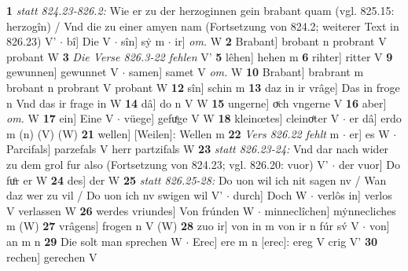 \documentclass[8pt,a4paper,notitlepage]{article}
\begin{document}
\begin{table}[ht]
\begin{minipage}[t]{0.5\linewidth}
\textbf{1} \textit{statt 824.23-826.2:} Wie er zu der herzoginnen gein brabant quam (vgl. 825.15: herzogîn) / Vnd die zu einer amyen nam (Fortsetzung von 824.2; weiterer Text in 826.23) V'   $\cdot$ bî] Die V  $\cdot$ sîn] sẏ m  $\cdot$ ir] \textit{om.} W \textbf{2} Brabant] brobant n probrant V probant W \textbf{3} \textit{Die Verse 826.3-22 fehlen} V'  \textbf{5} lêhen] hehen m \textbf{6} rihter] ritter V \textbf{9} gewunnen] gewunnet V  $\cdot$ samen] samet V \textit{om.} W \textbf{10} Brabant] brabrant m brobant n probrant V probant W \textbf{12} sîn] schin m \textbf{13} daz in ir vrâge] Das in froge n Vnd das ir frage in W \textbf{14} dâ] do n V W \textbf{15} ungerne] oͮch vngerne V \textbf{16} aber] \textit{om.} W \textbf{17} ein] Eine V  $\cdot$ vüege] gefuͤge V W \textbf{18} kleinœtes] cleinoͤter V  $\cdot$ er dâ] erdo m (n) (V) (W) \textbf{21} wellen] [Weilen]: Wellen m \textbf{22} \textit{Vers 826.22 fehlt} m   $\cdot$ er] es W  $\cdot$ Parcifals] parzefals V herr partzifals W \textbf{23} \textit{statt 826.23-24:} Vnd dar nach wider zu dem grol fur also (Fortsetzung von 824.23; vgl. 826.20: vuor) V'   $\cdot$ der vuor] Do fuͦr er W \textbf{24} des] der W \textbf{25} \textit{statt 826.25-28:} Do uon wil ich nit sagen nv / Wan daz wer zu vil / Do uon ich nv swigen wil V'   $\cdot$ durch] Doch W  $\cdot$ verlôs in] verlos V verlassen W \textbf{26} werdes vriundes] Von frúnden W  $\cdot$ minneclîchen] mẏnnecliches m (W) \textbf{27} vrâgens] frogen n V (W) \textbf{28} zuo ir] von in m von ir n fúr sv́ V  $\cdot$ von] an m n \textbf{29} Die solt man sprechen W  $\cdot$ Erec] ere m n [erec]: ereg V crig V' \textbf{30} rechen] gerechen V \newline
\end{minipage}
\end{table}
\newpage
\end{document}
